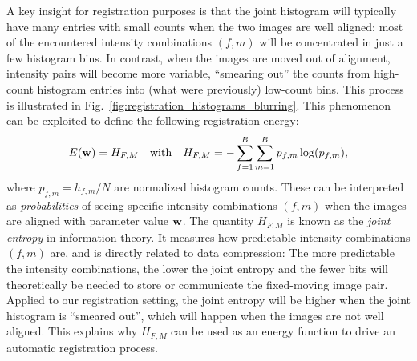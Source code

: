 \documentclass[10pt,twoside]{book}
\begin{document}
%
A key insight for registration purposes is that the joint histogram will typically have many entries with small counts when the two images are well aligned: most of the 
encountered
intensity combinations $(f,m)$ will be concentrated in just a few histogram bins.
In contrast, when the images are moved out of alignment, intensity pairs will become more variable, ``smearing out'' the counts from high-count histogram entries into (what were previously) low-count bins. This process is illustrated in Fig.~\ref{fig:registration_histograms_blurring}.
%
This phenomenon can be exploited to define the 
following registration energy:
$$
E(\fat{w}) 
= 
H_{F,M}%
\quad
\text{with}
\quad
H_{F,M}%
= 
- 
\sum_{f=1}^B \sum_{m=1}^B
p_{f,m} 
\log( p_{f,m} ),
$$
where 
$p_{f,m} = h_{f,m} / N$ are normalized histogram counts.
%
These can be interpreted as \emph{probabilities} of seeing specific intensity combinations $(f,m)$
when the images are aligned with parameter value $\mathbf{w}$.
%
The quantity $H_{F,M}$ is known as the \emph{joint entropy} in information theory. It measures how predictable intensity combinations $(f,m)$ are, and is directly related to data compression: The more predictable the intensity combinations, the lower the joint entropy and the fewer bits will theoretically be needed to store or communicate the fixed-moving image pair.
%
Applied to our registration setting, the joint entropy will be higher when the joint histogram is ``smeared out'', which will happen when the images are not well aligned. This explains why $H_{F,M}$ can be used as an energy function to drive an automatic registration process.
\end{document}
